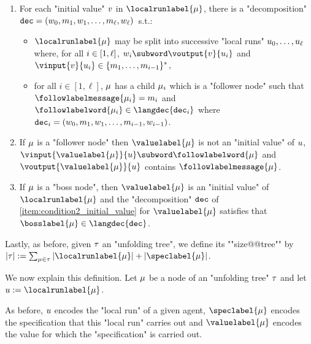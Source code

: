 \begin{definition}
\begin{enumerate}[label= (\roman*), ref=(\roman*)]
		\item \label{item:condition2_initial_value} For each "initial value" $v$ in $\localrunlabel{\node}$, there is a "decomposition" $\mathtt{dec} = (w_0, m_1, w_1, \ldots, m_{\ell}, w_{\ell})$~s.t.:
		\begin{itemize}
			\item $\localrunlabel{\node}$ may be split into successive "local runs" $u_0, \dots, u_{\ell}$ where, for all $i \in [1,\ell]$, $w_i \subword \voutput{\aval}{\localrun_i}$ and $\vinput{\aval}{\localrun_i} \in \set{m_1, \dots, m_{i-1}}^*$,
			\item for all $i \in [1,\ell]$, $\mu$ has a child $\mu_i$ which is a "follower node" such that $\followlabelmessage{\node_i} = m_i$ and $\followlabelword{\node_i} \in\langdec{\decsymb_i}$ where $\mathtt{dec}_i = (w_0, m_1, w_1, \ldots, m_{i-1}, w_{i-1})$.	\end{itemize}
		
		\item \label{item:condition3_follower_node} If $\mu$ is a "follower node" then $\valuelabel{\node}$ is not an "initial value" of $u$, $\vinput{\valuelabel{\node}}{\localrun} \subword \followlabelword{\node}$ and 
		$\voutput{\valuelabel{\node}}{\localrun}$ contains $\followlabelmessage{\node}$.
		
		\item \label{item:condition4_boss_node} If $\mu$ is a "boss node", then $\valuelabel{\node}$ is an "initial value" of $\localrunlabel{\node}$ and the "decomposition" $\mathtt{dec}$ of \ref{item:condition2_initial_value} for $\valuelabel{\node}$ satisfies that $\bosslabel{\node} \in \langdec{\decsymb}$.
	\end{enumerate}
	
	\AP Lastly, as before, given $\tau$ an "unfolding tree", we define its ""size@@tree"" by $\size{\tree} := \sum_{\node \in \tree} \size{\localrunlabel{\node}} + \size{\speclabel{\node}}$. %
\end{definition}
 
 We now explain this definition. Let $\mu$ be a node of an "unfolding tree" $\tau$ and let $\localrun := \localrunlabel{\node}$. 
 
 As before, $u$ encodes the "local run" of a given agent, $\speclabel{\node}$ encodes the specification that this "local run" carries out and $\valuelabel{\node}$ encodes the value for which the "specification" is carried out.

